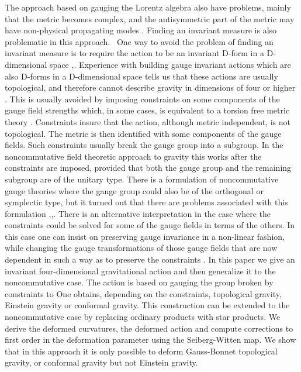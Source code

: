 \documentclass[a4paper,a4paper]{article}
\begin{document}
The approach based on gauging the Lorentz algebra also have problems, mainly
that the metric becomes complex, and the antisymmetric part of the metric may
have non-physical propagating modes \cite{complex}. Finding an invariant
measure is also problematic in this approach. \ One way to avoid the problem
of finding an invariant measure is to require the action to be an invariant
D-form in a D-dimensional space \cite{cho},\cite{CW}. Experience with building
gauge invariant actions which are also D-forms in a D-dimensional space tells
us that these actions are usually topological, and therefore cannot describe
gravity in dimensions of four or higher \cite{topology}. This is usually
avoided by imposing constraints on some components of the gauge field
strengths which, in some cases, is equivalent to a torsion free metric theory
\cite{van}. Constraints insure that the action, although metric independent,
is not topological. The metric is then identified with some components of the
gauge fields. Such constraints usually break the gauge group into a subgroup.
In the noncommutative field theoretic approach to gravity this works after the
constraints are imposed, provided that both the gauge group and the remaining
subgroup are of the unitary type. There is a formulation of noncommutative
gauge theories where the gauge group could also be of the orthogonal or
symplectic type, but it turned out that there are problems associated with
this formulation \cite{sheik},\cite{wess},\cite{deformed}. There is an
alternative interpretation in the case where the constraints could be solved
for some of the gauge fields in terms of the others. In this case one can
insist on preserving gauge invariance in a non-linear fashion, while changing
the gauge transformations of those gauge fields that are now dependent in such
a way as to preserve the constraints \cite{van}. In this paper we give an
invariant four-dimensional gravitational action and then generalize it to the
noncommutative case. The action is based on gauging the group \coordHE{} broken
by constraints to \coordHE{} One obtains, depending on the
constraints, topological gravity, Einstein gravity or conformal gravity. This
construction can be extended to the noncommutative case by replacing ordinary
products with star products. We derive the deformed curvatures, the deformed
action and compute corrections to first order in the deformation parameter
\myHighlight{$\theta$}\coordHE{} using the Seiberg-Witten map. We show that in this approach it is
only possible to deform Gauss-Bonnet topological gravity, or conformal gravity
but not Einstein gravity.
\end{document}
